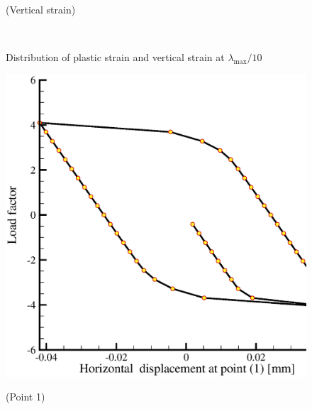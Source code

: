 \begin{figure}[!thb]
\begin{center}
\begin{minipage}[t]{0.48\textwidth}
\begin{center}
    \centerline{(Vertical strain)}
    \end{center}
   \end{minipage}\\
  \end{center}
  \caption{Distribution of plastic strain and vertical strain at $\lambda_{\mathrm{max}}/10$}
  \label{Mp_ex2_cont1}
\end{figure}

\begin{figure}[!htb]
  \begin{center}
   \begin{minipage}[t]{0.48\textwidth}
     \begin{center}
    \includegraphics[scale=0.28]{PART_II/M/ex1_load_v_ux_p1.eps}
    \centerline{(Point 1)}
    \end{center}
   \end{minipage}
   \hspace{0.02\textwidth}
   \begin{minipage}[t]{0.48\textwidth}
    \begin{center}

\end{center}
\end{minipage}
\end{center}
\end{figure}
